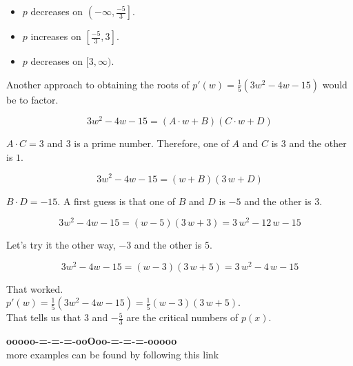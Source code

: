 \documentclass{ximera}
\begin{document}
\begin{itemize}
\item $p$ decreases on $\left(-\infty, \frac{-5}{3}\right]$.
\item $p$ increases on $\left[\frac{-5}{3}, 3\right]$.
\item $p$ decreases on $[3, \infty)$.
\end{itemize}



Another approach to obtaining the roots of $p'(w) = \frac{1}{5}(3w^2 - 4w - 15)$ would be to factor. 


\[
3w^2 - 4w - 15      = (A \cdot w + B)(C \cdot w + D) 
\]

$A \cdot C = 3$ and $3$ is a prime number.  Therefore, one of $A$ and $C$ is $3$ and the other is $1$.



\[
3w^2 - 4w - 15      = (w + B)(3 \, w + D) 
\]



$B \cdot D = -15$.  A first guess is that one of $B$ and $D$ is $-5$ and the other is $3$. 


\[
3w^2 - 4w - 15      = (w - 5)(3 \, w + 3) = 3 \, w^2 -12 \, w - 15
\]



Let's try it the other way, $-3$ and the other is $5$.



\[
3w^2 - 4w - 15     = (w - 3)(3 \, w + 5) = 3 \, w^2  -4 \, w - 15
\]



That worked. \\



$p'(w) = \frac{1}{5}(3w^2 - 4w - 15) = \frac{1}{5} (w - 3)(3 \, w + 5)$. \\


That tells us that $3$ and $-\frac{5}{3}$ are the critical numbers of $p(x)$.







\begin{onlineOnly}
\begin{center}
\textbf{\textcolor{green!50!black}{ooooo-=-=-=-ooOoo-=-=-=-ooooo}} \\

more examples can be found by following this link\\ 

\end{center}
\end{onlineOnly}
\end{document}
